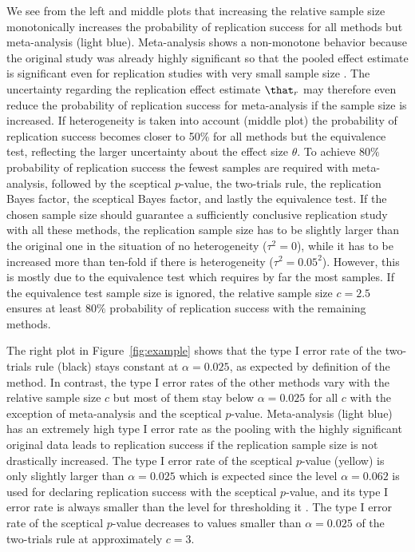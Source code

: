 We see from the left and middle plots that increasing the relative sample size
monotonically increases the probability of replication success for all methods
but meta-analysis (light blue). Meta-analysis shows a non-monotone behavior
because the original study was already highly significant so that the pooled
effect estimate is significant even for replication studies with very small
sample size \citep{Micheloud2020}. The uncertainty regarding the replication
effect estimate $\that_{r}$ may therefore even reduce the probability of
replication success for meta-analysis if the sample size is increased. If
heterogeneity is taken into account (middle plot) the probability of replication
success becomes closer to 50\% for all methods but the equivalence test,
reflecting the larger uncertainty about the effect size $\theta$. To achieve
$80\%$ probability of replication success the fewest
samples are required with meta-analysis, followed by the sceptical $p$-value,
the two-trials rule, the replication Bayes factor, the sceptical Bayes factor,
and lastly the equivalence test. If the chosen sample size should guarantee a
sufficiently conclusive replication study with all these methods, the
replication sample size has to be slightly larger than the original one in the
situation of no heterogeneity ($\tau^{2} = 0$), while it has to be increased
more than ten-fold if there is heterogeneity
($\tau^{2} = 0.05^{2}$). However, this is mostly due to the
equivalence test which requires by far the most samples. If the equivalence test
sample size is ignored, the relative sample size
$c = 2.5$ ensures at least
$80\%$ probability of replication success with the
remaining methods.


The right plot in Figure~\ref{fig:example} shows that the type I error rate of
the two-trials rule (black) stays constant at
$\alpha = 0.025$, as expected by definition of the method.
In contrast, the type I error rates of the other methods vary with the relative
sample size $c$ but most of them stay below
$\alpha = 0.025$ for all $c$ with the exception of
meta-analysis and the sceptical $p$-value. Meta-analysis (light blue) has an
extremely high type I error rate as the pooling with the highly significant
original data leads to replication success if the replication sample size is not
drastically increased. The type I error rate of the sceptical $p$-value (yellow)
is only slightly larger than $\alpha = 0.025$ which is
expected since the level $\alpha = 0.062$ is used for
declaring replication success with the sceptical $p$-value, and its type I error
rate is always smaller than the level for thresholding it \citep{Held2020}. The
type I error rate of the sceptical $p$-value decreases to values smaller than
$\alpha = 0.025$ of the two-trials rule at approximately
$c = 3$.





